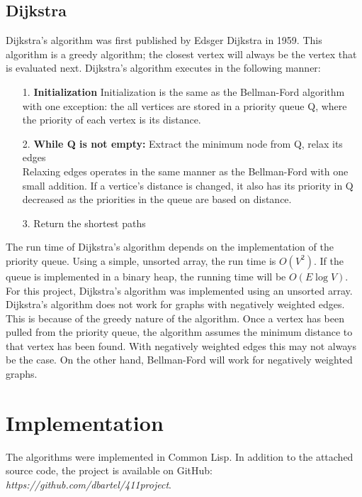 \documentclass{article}
\begin{document}
    \subsection*{Dijkstra}
Dijkstra's algorithm was first published by Edsger Dijkstra in 1959. This algorithm is a greedy algorithm; the closest vertex will always be the vertex that is evaluated next. Dijkstra's algorithm executes in the following manner:
    \begin{enumerate}
      \item[1.] \textbf{Initialization} Initialization is the same as the Bellman-Ford algorithm with one exception: the all vertices are stored in a priority queue Q, where the priority of each vertex is its distance.
      \item[2.] \textbf{While Q is not empty:} Extract the minimum node from Q, relax its edges\\
        Relaxing edges operates in the same manner as the Bellman-Ford with one small addition. If a vertice's distance is changed, it also has its priority in Q decreased as the priorities in the queue are based on distance.
      \item[3.] Return the shortest paths
    \end{enumerate}
The run time of Dijkstra's algorithm depends on the implementation of the priority queue. Using a simple, unsorted array, the run time is $O(V^2)$. If the queue is implemented in a binary heap, the running time will be $O(E \log V)$.  For this project, Dijkstra's algorithm was implemented using an unsorted array.
Dijkstra's algorithm does not work for graphs with negatively weighted edges. This is because of the greedy nature of the algorithm. Once a vertex has been pulled from the priority queue, the algorithm assumes the minimum distance to that vertex has been found. With negatively weighted edges this may not always be the case. On the other hand, Bellman-Ford will work for negatively weighted graphs.
  \section*{Implementation}
The algorithms were implemented in Common Lisp. In addition to the attached source code, the project is available on GitHub: \textit{https://github.com/dbartel/411project}. 
\end{document}

